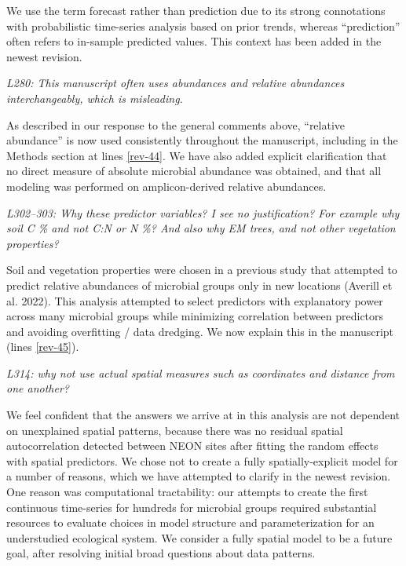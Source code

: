\documentclass[11pt]{article}
\begin{document}
We use the term forecast rather than prediction due to its strong connotations with probabilistic time-series analysis based on prior trends, whereas ``prediction'' often refers to in-sample predicted values. This context has been added in the newest revision.

\bigskip

\textit{L280: This manuscript often uses abundances and relative abundances interchangeably, which is misleading.}

As described in our response to the general comments above, ``relative abundance'' is now used consistently throughout the manuscript, including in the Methods section at lines \ref{rev-44}. We have also added explicit clarification that no direct measure of absolute microbial abundance was obtained, and that all modeling was performed on amplicon-derived relative abundances.

\bigskip

\textit{L302--303: Why these predictor variables? I see no justification? For example why soil C \% and not C:N or N \%? And also why EM trees, and not other vegetation properties?}

Soil and vegetation properties were chosen in a previous study that attempted to predict relative abundances of microbial groups only in new locations (Averill et al. 2022). This analysis attempted to select predictors with explanatory power across many microbial groups while minimizing correlation between predictors and avoiding overfitting / data dredging. We now explain this in the manuscript (lines \ref{rev-45}).

\bigskip

\textit{L314: why not use actual spatial measures such as coordinates and distance from one another?}

We feel confident that the answers we arrive at in this analysis are not dependent on unexplained spatial patterns, because there was no residual spatial autocorrelation detected between NEON sites after fitting the random effects with spatial predictors. We chose not to create a fully spatially-explicit model for a number of reasons, which we have attempted to clarify in the newest revision. One reason was computational tractability: our attempts to create the first continuous time-series for hundreds for microbial groups required substantial resources to evaluate choices in model structure and parameterization for an understudied ecological system. We consider a fully spatial model to be a future goal, after resolving initial broad questions about data patterns.
\end{document}
